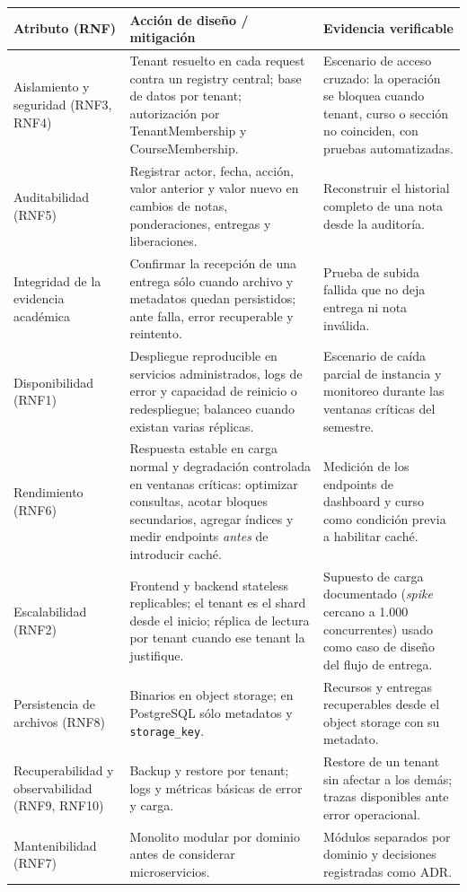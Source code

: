 \documentclass[letterpaper,10pt]{article}
\begin{document}
{\small
\setlength{\LTpre}{0pt}
\setlength{\LTpost}{3pt}
\begin{longtable}{|p{2.45cm}|*{2}{>{\raggedright\arraybackslash}p{\dimexpr(\textwidth-2.45cm-6\tabcolsep-4\arrayrulewidth)/2\relax}|}}
\hline
\textbf{Atributo (RNF)} & \textbf{Acción de diseño / mitigación} & \textbf{Evidencia verificable} \\
\hline
\endhead
Aislamiento y seguridad (RNF3, RNF4) & Tenant resuelto en cada request contra un registry central; base de datos por tenant; autorización por TenantMembership y CourseMembership. & Escenario de acceso cruzado: la operación se bloquea cuando tenant, curso o sección no coinciden, con pruebas automatizadas. \\
\hline
Auditabilidad (RNF5) & Registrar actor, fecha, acción, valor anterior y valor nuevo en cambios de notas, ponderaciones, entregas y liberaciones. & Reconstruir el historial completo de una nota desde la auditoría. \\
\hline
Integridad de la evidencia académica & Confirmar la recepción de una entrega sólo cuando archivo y metadatos quedan persistidos; ante falla, error recuperable y reintento. & Prueba de subida fallida que no deja entrega ni nota inválida. \\
\hline
Disponibilidad (RNF1) & Despliegue reproducible en servicios administrados, logs de error y capacidad de reinicio o redespliegue; balanceo cuando existan varias réplicas. & Escenario de caída parcial de instancia y monitoreo durante las ventanas críticas del semestre. \\
\hline
Rendimiento (RNF6) & Respuesta estable en carga normal y degradación controlada en ventanas críticas: optimizar consultas, acotar bloques secundarios, agregar índices y medir endpoints \emph{antes} de introducir caché. & Medición de los endpoints de dashboard y curso como condición previa a habilitar caché. \\
\hline
Escalabilidad (RNF2) & Frontend y backend stateless replicables; el tenant es el shard desde el inicio; réplica de lectura por tenant cuando ese tenant la justifique. & Supuesto de carga documentado (\emph{spike} cercano a 1.000 concurrentes) usado como caso de diseño del flujo de entrega. \\
\hline
Persistencia de archivos (RNF8) & Binarios en object storage; en PostgreSQL sólo metadatos y \texttt{storage\_key}. & Recursos y entregas recuperables desde el object storage con su metadato. \\
\hline
Recuperabilidad y observabilidad (RNF9, RNF10) & Backup y restore por tenant; logs y métricas básicas de error y carga. & Restore de un tenant sin afectar a los demás; trazas disponibles ante error operacional. \\
\hline
Mantenibilidad (RNF7) & Monolito modular por dominio antes de considerar microservicios. & Módulos separados por dominio y decisiones registradas como ADR. \\
\hline
\end{longtable}}
\end{document}
